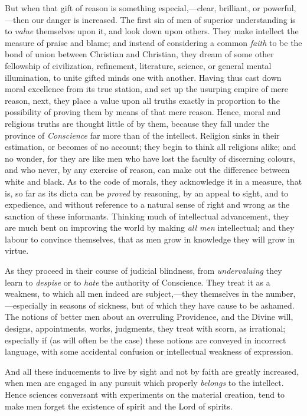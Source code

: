 But when that gift of reason is something
especial,—clear, brilliant, or powerful,—then
our danger is increased. The first sin of men of superior
understanding is to \emph{value} themselves upon it,
and look down upon others. They make intellect the
measure of praise and blame; and instead of considering a
common \emph{faith} to be the bond of union between
Christian and Christian, they dream of some other
fellowship of civilization, refinement, literature,
science, or general mental illumination, to unite gifted
minds one with another. Having thus cast down moral
excellence from its true station, and set up the usurping
empire of mere reason, next, they place a value upon all
truths exactly in proportion to the possibility of
proving them by means of that mere reason. Hence, moral
and religious truths are thought little of by them,
because they fall under the province of \emph{Conscience} far
more than of the intellect. Religion sinks in their
estimation, or becomes of no account; they begin to think
all religions alike; and no wonder, for they are like men
who have lost the faculty of discerning colours, and who
never, by any exercise of reason, can make out the
difference between white and black. As to the code of
morals, they acknowledge it in a measure, that is, so far
as its dicta can be \emph{proved} by reasoning, by an
appeal to sight, and to expedience, and without reference
to a natural sense of right and wrong as the sanction of
these informants. Thinking much of intellectual
advancement, they are much bent on improving the world by
making \emph{all men} intellectual; and they labour to
convince themselves, that as men grow in knowledge they
will grow in virtue.

As they proceed in their course of judicial blindness,
from \emph{undervaluing} they learn to \emph{despise}
or to \emph{hate} the authority of Conscience. They
treat it as a weakness, to which all men indeed are
subject,—they themselves in the
number,—especially in seasons of sickness, but of
which they have cause to be ashamed. The notions of better men about an overruling Providence, and the Divine
will, designs, appointments, works, judgments, they treat
with scorn, as irrational; especially if (as will often
be the case) these notions are conveyed in incorrect
language, with some accidental confusion or intellectual
weakness of expression.

And all these inducements to live by sight and not by
faith are greatly increased, when men are engaged in any
pursuit which properly \emph{belongs} to the intellect.
Hence sciences conversant with experiments on the
material creation, tend to make men forget the existence
of spirit and the Lord of spirits.

